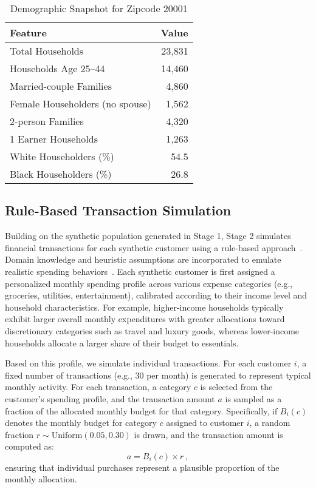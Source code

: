 \documentclass[conference]{IEEEtran}
\begin{document}
\begin{table}[htbp]
\centering
\caption{Demographic Snapshot for Zipcode 20001}
\begin{tabular}{|l|r|}
\hline
\textbf{Feature} & \textbf{Value} \\
\hline
Total Households & 23,831 \\
Households Age 25–44 & 14,460 \\
Married-couple Families & 4,860 \\
Female Householders (no spouse) & 1,562 \\
2-person Families & 4,320 \\
1 Earner Households & 1,263 \\
White Householders (\%) & 54.5 \\
Black Householders (\%) & 26.8 \\
\hline
\end{tabular}
\label{tab:demographics_20001}
\end{table}

\subsection{Rule-Based Transaction Simulation}
Building on the synthetic population generated in Stage 1, Stage 2 simulates financial transactions for each synthetic customer using a rule-based approach~\cite{paysim2016}. Domain knowledge and heuristic assumptions are incorporated to emulate realistic spending behaviors~\cite{paysim2016}. Each synthetic customer is first assigned a personalized monthly spending profile across various expense categories (e.g., groceries, utilities, entertainment), calibrated according to their income level and household characteristics. For example, higher-income households typically exhibit larger overall monthly expenditures with greater allocations toward discretionary categories such as travel and luxury goods, whereas lower-income households allocate a larger share of their budget to essentials.

Based on this profile, we simulate individual transactions. For each customer \( i \), a fixed number of transactions (e.g., 30 per month) is generated to represent typical monthly activity. For each transaction, a category \( c \) is selected from the customer’s spending profile, and the transaction amount \( a \) is sampled as a fraction of the allocated monthly budget for that category. Specifically, if \( B_i(c) \) denotes the monthly budget for category \( c \) assigned to customer \( i \), a random fraction \( r \sim \mathrm{Uniform}(0.05, 0.30) \) is drawn, and the transaction amount is computed as:
\begin{equation}
a = B_i(c) \times r~,
\label{eq:txn-amount}
\end{equation}
ensuring that individual purchases represent a plausible proportion of the monthly allocation.
\end{document}
